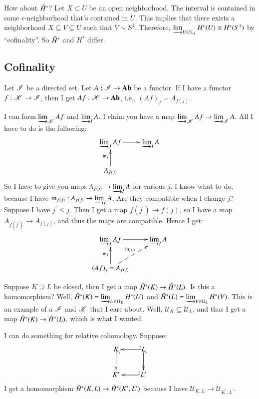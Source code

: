 How about $\check{H}^\ast$? Let $X\subset U$ be an open neighborhood. The interval is contained in some $\epsilon$-neighborhood that's contained in $U$. This implies that there exists a neighborhood $X\subseteq V\subseteq U$ such that $V\sim S^1$. Therefore, $\varinjlim_{U\in\mathcal{U}_X}H^\ast(U)\cong H^\ast(S^1)$ by ``cofinality''. So $\check{H}^\ast$ and $H^\ast$ differ.
\subsection{Cofinality}
Let $\mathscr I$ be a directed set. Let $A:\mathscr I\to \mathbf{Ab}$ be a functor. If I have a functor $f:\mathscr K\to\mathscr I$, then I get $Af:\mathscr K\to\mathbf{Ab}$, i.e., $(Af)_j=A_{f(j)}$.

I can form $\varinjlim_{\mathscr K}Af$ and $\varinjlim_{I}A$. I claim you have a map $\varinjlim_{\mathscr K}Af\to\varinjlim_{\mathscr I}A$. All I have to do is the following:
\begin{equation*}
\xymatrix{
	\varinjlim_{J}Af\ar[r] & \varinjlim_{I}A\\
	A_{f(j)}\ar[u]^{\mathrm{in}_j}
}
\end{equation*}
So I have to give you maps $A_{f(j)}\to\varinjlim_{I}A$ for various $j$. I know what to do, because I have $\mathrm{in}_{f(j)}:A_{f(j)}\to\varinjlim_{I}A$. Are they compatible when I change $j$? Suppose I have $j^\prime\leq j$. Then I get a map $f(j^\prime)\to f(j)$, so I have a map $A_{f(j^\prime)}\to A_{f(j)}$, and thus the maps are compatible. Hence I get:
\begin{equation*}
\xymatrix{
	\varinjlim_{J}Af\ar[r] & \varinjlim_{I}A\\
	(Af)_j=A_{f(j)}\ar@{-->}[ur]^{\mathrm{in}_{f(j)}}\ar[u]^{\mathrm{in}_j}
}
\end{equation*}
\begin{example}
Suppose $K\supseteq L$ be closed, then I get a map $\check{H}^\ast(K)\to\check{H}^\ast(L)$. Is this a homomorphism? Well, $\check{H}^\ast(K)=\varinjlim_{U\in\mathcal{U}_K}H^\ast(U)$ and $\check{H}^\ast(L)=\varinjlim_{V\in\mathcal{U}_L}H^\ast(V)$. This is an example of a $\mathscr I$ and $\mathscr K$ that I care about. Well, $\mathcal{U}_K\subseteq\mathcal{U}_L$, and thus I get a map $\check{H}^\ast(K)\to\check{H}^\ast(L)$, which is what I wanted.

I can do something for relative cohomology. Suppose:
\begin{equation*}
\xymatrix{K\ar@{^(->}[d] & L\ar@{^(->}[d]\ar@{_(->}[l] \\ K^\prime & L^\prime\ar@{_(->}[l]}
\end{equation*}
I get a homomorphism $\check{H}^\ast(K,L)\to \check{H}^\ast(K^\prime,L^\prime)$ because I have $\mathcal{U}_{K,L}\to\mathcal{U}_{K^\prime,L^\prime}$.
\end{example}
